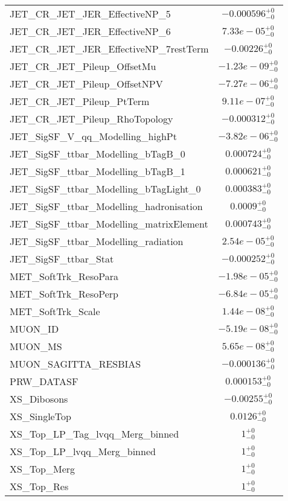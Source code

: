 \begin{tabular}{|l|c|}
JET\_CR\_JET\_JER\_EffectiveNP\_5 & $-0.000596^{+0}_{-0}$ \\
JET\_CR\_JET\_JER\_EffectiveNP\_6 & $7.33e-05^{+0}_{-0}$ \\
JET\_CR\_JET\_JER\_EffectiveNP\_7restTerm & $-0.00226^{+0}_{-0}$ \\
JET\_CR\_JET\_Pileup\_OffsetMu & $-1.23e-09^{+0}_{-0}$ \\
JET\_CR\_JET\_Pileup\_OffsetNPV & $-7.27e-06^{+0}_{-0}$ \\
JET\_CR\_JET\_Pileup\_PtTerm & $9.11e-07^{+0}_{-0}$ \\
JET\_CR\_JET\_Pileup\_RhoTopology & $-0.000312^{+0}_{-0}$ \\
JET\_SigSF\_V\_qq\_Modelling\_highPt & $-3.82e-06^{+0}_{-0}$ \\
JET\_SigSF\_ttbar\_Modelling\_bTagB\_0 & $0.000724^{+0}_{-0}$ \\
JET\_SigSF\_ttbar\_Modelling\_bTagB\_1 & $0.000621^{+0}_{-0}$ \\
JET\_SigSF\_ttbar\_Modelling\_bTagLight\_0 & $0.000383^{+0}_{-0}$ \\
JET\_SigSF\_ttbar\_Modelling\_hadronisation & $0.0009^{+0}_{-0}$ \\
JET\_SigSF\_ttbar\_Modelling\_matrixElement & $0.000743^{+0}_{-0}$ \\
JET\_SigSF\_ttbar\_Modelling\_radiation & $2.54e-05^{+0}_{-0}$ \\
JET\_SigSF\_ttbar\_Stat & $-0.000252^{+0}_{-0}$ \\
MET\_SoftTrk\_ResoPara & $-1.98e-05^{+0}_{-0}$ \\
MET\_SoftTrk\_ResoPerp & $-6.84e-05^{+0}_{-0}$ \\
MET\_SoftTrk\_Scale & $1.44e-08^{+0}_{-0}$ \\
MUON\_ID & $-5.19e-08^{+0}_{-0}$ \\
MUON\_MS & $5.65e-08^{+0}_{-0}$ \\
MUON\_SAGITTA\_RESBIAS & $-0.000136^{+0}_{-0}$ \\
PRW\_DATASF & $0.000153^{+0}_{-0}$ \\
XS\_Dibosons & $-0.00255^{+0}_{-0}$ \\
XS\_SingleTop & $0.0126^{+0}_{-0}$ \\
XS\_Top\_LP\_Tag\_lvqq\_Merg\_binned & $1^{+0}_{-0}$ \\
XS\_Top\_LP\_lvqq\_Merg\_binned & $1^{+0}_{-0}$ \\
XS\_Top\_Merg & $1^{+0}_{-0}$ \\
XS\_Top\_Res & $1^{+0}_{-0}$ \\

\end{tabular}
